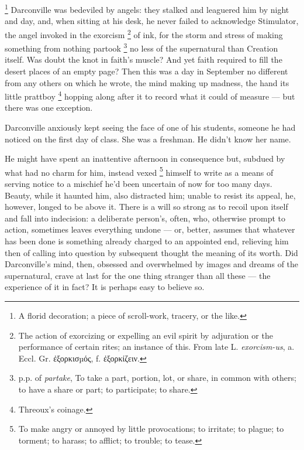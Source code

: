 \footnote{A florid decoration; a piece of scroll-work, tracery, or the like.}
Darconville was bedeviled by angels: they stalked and leaguered him by night and
day, and, when sitting at his desk, he never failed to acknowledge Stimulator,
the angel invoked in the exorcism 
\footnote{The action of exorcizing or expelling an evil spirit by adjuration or 
the performance of certain rites; an instance of this. From late L.
\textit{exorcism-us}, a. Eccl. Gr. ἐξορκισµός, f. ἐξορκίζειν.}
of ink, for the storm and stress of making
something from nothing partook 
\footnote{p.p. of \textit{partake}, To take a part, portion, lot, or share, in
common with others; to have a share or part; to participate; to share.
}
no less of the supernatural than Creation itself.
Was doubt the knot in faith’s muscle? And yet faith required to fill the desert
places of an empty page? Then this was a day in September no different from any
others on which he wrote, the mind making up madness, the hand its little
prattboy \footnote{Threoux's coinage.}
hopping along after it to record what it could of measure --- but there was
one exception.

  Darconville anxiously kept seeing the face of one of his students, someone he
had noticed on the first day of class. She was a freshman. He didn’t know her
name.

  He might have spent an inattentive afternoon in consequence but, subdued by
what had no charm for him, instead vexed 
\footnote{To make angry or annoyed by little provocations; to irritate; to
plague; to torment; to harass; to afflict; to trouble; to tease.
}
himself to write as a means of serving
notice to a mischief he’d been uncertain of now for too many days. Beauty, while
it haunted him, also distracted him; unable to resist its appeal, he, however,
longed to be above it. There is a will so strong as to recoil upon itself and
fall into indecision: a deliberate person’s, often, who, otherwise prompt to
action, sometimes leaves everything undone --- or, better, assumes that 
whatever has
been done is something already charged to an appointed end, relieving him then
of calling into question by subsequent thought the meaning of its worth. Did
Darconville’s mind, then, obsessed and overwhelmed by images and dreams of the
supernatural, crave at last for the one thing stranger than all these --- the
experience of it in fact? It is perhaps easy to believe so.

